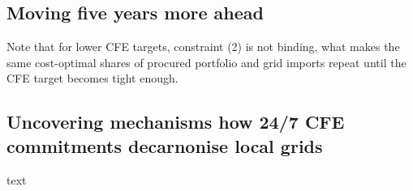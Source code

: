 \subsection{Moving five years more ahead}
\label{subsec:time}

Note that for lower CFE targets, constraint (2) is not binding, what makes the same cost-optimal shares of procured portfolio and grid imports repeat until the CFE target becomes tight enough.

\subsection{Uncovering mechanisms how 24/7 CFE commitments decarnonise local grids}
\label{subsec:mechanisms}

text 

